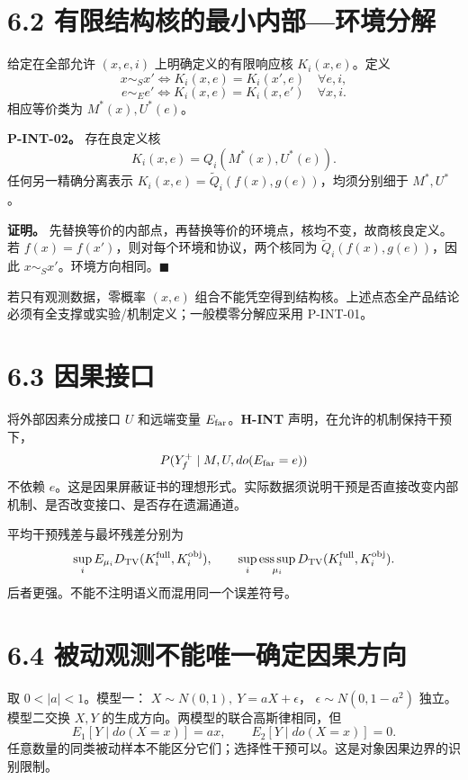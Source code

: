 \documentclass[
  11pt,
  oneside]{book}
\begin{document}
\section{6.2 有限结构核的最小内部---环境分解}\label{ux6709ux9650ux7ed3ux6784ux6838ux7684ux6700ux5c0fux5185ux90e8ux73afux5883ux5206ux89e3}

给定在全部允许 \((x,e,i)\) 上明确定义的有限响应核 \(K_i(x,e)\)。定义 \[x\sim_Sx'\iff K_i(x,e)=K_i(x',e)\quad\forall e,i,\] \[e\sim_Ee'\iff K_i(x,e)=K_i(x,e')\quad\forall x,i.\] 相应等价类为 \(M^*(x),U^*(e)\)。

\hypertarget{p-int-02}{}\label{p-int-02}

\textbf{P-INT-02。} 存在良定义核 \[K_i(x,e)=Q_i(M^*(x),U^*(e)).\] 任何另一精确分离表示 \(K_i(x,e)=\widetilde Q_i(f(x),g(e))\)，均须分别细于 \(M^*,U^*\)。

\textbf{证明。} 先替换等价的内部点，再替换等价的环境点，核均不变，故商核良定义。若 \(f(x)=f(x')\)，则对每个环境和协议，两个核同为 \(\widetilde Q_i(f(x),g(e))\)，因此 \(x\sim_Sx'\)。环境方向相同。\(\blacksquare\)

若只有观测数据，零概率 \((x,e)\) 组合不能凭空得到结构核。上述点态全产品结论必须有全支撑或实验/机制定义；一般模零分解应采用 P-INT-01。

\section{6.3 因果接口}\label{ux56e0ux679cux63a5ux53e3}

将外部因素分成接口 \(U\) 和远端变量 \(E_{\rm far}\)。\textbf{H-INT} 声明，在允许的机制保持干预下， \[P(Y_f^+\mid M,U,do(E_{\rm far}=e))\] 不依赖 \(e\)。这是因果屏蔽证书的理想形式。实际数据须说明干预是否直接改变内部机制、是否改变接口、是否存在遗漏通道。

平均干预残差与最坏残差分别为 \[\sup_i E_{\mu_i}D_{\rm TV}(K_i^{\rm full},K_i^{\rm obj}),
\qquad
\sup_i\operatorname*{ess\,sup}_{\mu_i}
D_{\rm TV}(K_i^{\rm full},K_i^{\rm obj}).\] 后者更强。不能不注明语义而混用同一个误差符号。

\section{6.4 被动观测不能唯一确定因果方向}\label{ux88abux52a8ux89c2ux6d4bux4e0dux80fdux552fux4e00ux786eux5b9aux56e0ux679cux65b9ux5411}

取 \(0<|a|<1\)。模型一： \(X\sim N(0,1),\ Y=aX+\epsilon\)， \(\epsilon\sim N(0,1-a^2)\) 独立。 模型二交换 \(X,Y\) 的生成方向。两模型的联合高斯律相同，但 \[E_1[Y\mid do(X=x)]=ax,\qquad
E_2[Y\mid do(X=x)]=0.\] 任意数量的同类被动样本不能区分它们；选择性干预可以。这是对象因果边界的识别限制。
\end{document}
